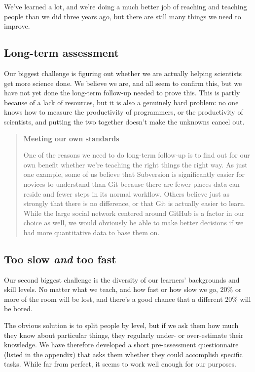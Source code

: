 \documentclass[10pt,a4paper,twocolumn]{article}
\begin{document}
We've learned a lot, and we're doing a much better job of reaching and
teaching people than we did three years ago, but there are still many
things we need to improve.

\subsection*{Long-term assessment}

Our biggest challenge is figuring out whether we are actually helping
scientists get more science done.  We believe we are, and
\cite{aranda2012,libarkin2012,schossau2014,simperler2015} all seem to
confirm this, but we have not yet done the long-term follow-up needed
to prove this. This is partly because of a lack of resources, but it
is also a genuinely hard problem: no one knows how to measure the
productivity of programmers, or the productivity of scientists, and
putting the two together doesn't make the unknowns cancel out.

\begin{quote}
\textbf{Meeting our own standards}

One of the reasons we need to do long-term follow-up is to find out
for our own benefit whether we're teaching the right things the right
way.  As just one example, some of us believe that Subversion is
significantly easier for novices to understand than Git because there
are fewer places data can reside and fewer steps in its normal
workflow. Others believe just as strongly that there is no difference,
or that Git is actually easier to learn. While the large social
network centered around GitHub is a factor in our choice as well, we
would obviously be able to make better decisions if we had more
quantitative data to base them on.
\end{quote}

\subsection*{Too slow \emph{and} too fast}

Our second biggest challenge is the diversity of our learners'
backgrounds and skill levels. No matter what we teach, and how fast or
how slow we go, 20\% or more of the room will be lost, and there's a
good chance that a different 20\% will be bored.

The obvious solution is to split people by level, but if we ask them
how much they know about particular things, they regularly under- or
over-estimate their knowledge.  We have therefore developed a short
pre-assessment questionnaire (listed in the appendix) that asks them
whether they could accomplish specific tasks.  While far from perfect,
it seems to work well enough for our purposes.
\end{document}

